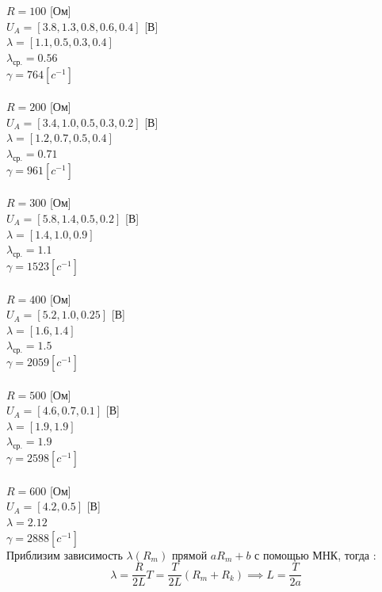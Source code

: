 \documentclass[10pt]{article}
\begin{document}
\begin{enumerate}
    $R = 100 $ [Ом] \\ 
    $U_{A} = [3.8,1.3,0.8,0.6,0.4]$ [В] \\
    $\lambda = [1.1, 0.5, 0.3, 0.4] $ \\ 
    $\lambda_{\text{ср.}} = 0.56$ \\ 
    $\gamma = 764 [c^{-1}]$ \\ 
    \\
    $R = 200 $ [Ом] \\ 
    $U_{A} = [3.4,1.0,0.5,0.3,0.2]$ [В] \\
    $\lambda = [1.2, 0.7, 0.5, 0.4] $ \\ 
    $\lambda_{\text{ср.}} = 0.71$ \\ 
    $\gamma = 961 [c^{-1}]$ \\ 
    \\
    $R = 300 $ [Ом] \\ 
    $U_{A} = [5.8,1.4,0.5,0.2]$ [В] \\
    $\lambda = [1.4, 1.0, 0.9] $ \\ 
    $\lambda_{\text{ср.}} = 1.1$ \\ 
    $\gamma = 1523 [c^{-1}]$ \\ 
    \\
    $R = 400 $ [Ом] \\ 
    $U_{A} = [5.2,1.0,0.25]$ [В] \\
    $\lambda = [1.6, 1.4] $ \\ 
    $\lambda_{\text{ср.}} = 1.5$ \\ 
    $\gamma = 2059 [c^{-1}]$ \\ 
    \\
    $R = 500 $ [Ом] \\ 
    $U_{A} = [4.6,0.7,0.1]$ [В] \\
    $\lambda = [1.9, 1.9] $ \\ 
    $\lambda_{\text{ср.}} = 1.9$ \\ 
    $\gamma = 2598 [c^{-1}]$ \\ 
    \\
    $R = 600 $ [Ом] \\ 
    $U_{A} = [4.2,0.5]$ [В] \\
    $\lambda = 2.12 $ \\ 
    $\gamma = 2888 [c^{-1}]$ \\ 
    Приблизим зависимость $\lambda(R_m)$ прямой $a R_m + b$ с помощью МНК, тогда : 
    \begin{equation}
        \lambda = \frac{R}{2 L} T = \frac{T}{2 L} (R_m + R_k) \implies L = \frac{T}{2 a}
    \end{equation}


\end{enumerate}
\end{document}
